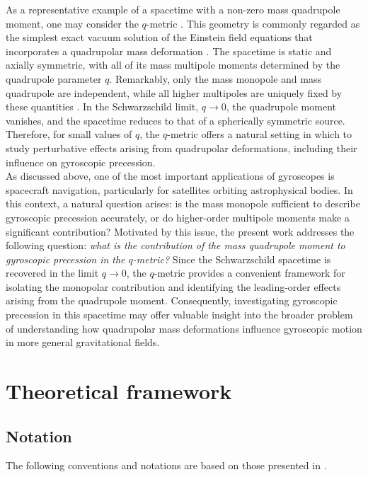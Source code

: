 \documentclass[12pt]{article}
\begin{document}
As a representative example of a spacetime with a non-zero mass quadrupole moment, one may consider the $q$-metric \cite{quevedo2011mass}. This geometry is commonly regarded as the simplest exact vacuum solution of the Einstein field equations that incorporates a quadrupolar mass deformation \cite{quevedo2016quadrupolar, beissen2023gravitational}. The spacetime is static and axially symmetric, with all of its mass multipole moments determined by the quadrupole parameter $q$. Remarkably, only the mass monopole and mass quadrupole are independent, while all higher multipoles are uniquely fixed by these quantities \cite{quevedo2011mass}. In the Schwarzschild limit, $q \to 0$, the quadrupole moment vanishes, and the spacetime reduces to that of a spherically symmetric source. Therefore, for small values of $q$,  the $q$-metric offers a natural setting in which to study perturbative effects arising from quadrupolar deformations, including their influence on gyroscopic precession.\\


As discussed above, one of the most important applications of gyroscopes is spacecraft navigation, particularly for satellites orbiting astrophysical bodies. In this context, a natural question arises: is the mass monopole sufficient to describe gyroscopic precession accurately, or do higher-order multipole moments make a significant contribution? Motivated by this issue, the present work addresses the following question: {\it what is the contribution of the mass quadrupole moment to gyroscopic precession in the $q$-metric? }Since the Schwarzschild spacetime is recovered in the limit $q \to 0$, the $q$-metric provides a convenient framework for isolating the monopolar contribution and identifying the leading-order effects arising from the quadrupole moment. Consequently, investigating gyroscopic precession in this spacetime may offer valuable insight into the broader problem of understanding how quadrupolar mass deformations influence gyroscopic motion in more general gravitational fields.



\section{Theoretical framework}

\subsection{Notation}
The following conventions and notations are based on those presented in \cite{gourgoulhon2013special, chandrasekhar1998mathematical}.
\end{document}
